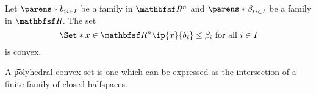 


\begin{corr}
  Let $\parens*{b_i}_{i \in I}$ be a family in $\R^n$ and $\parens*{\beta_i}_{i \in I}$ be a family in $\R$. The set
$$
  \Set*{x \in \R^n}{\ip{x}{b_i} \leq \beta_i \text{ for all } i \in I}
$$
is convex.
\end{corr}

A \t{polyhedral} convex set is one which can be expressed as the intersection of a finite family of closed halfspaces.
